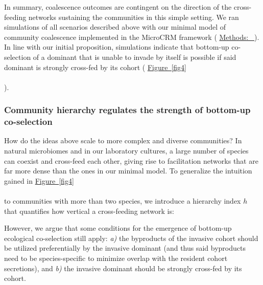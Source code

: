\documentclass[a4paper,10pt]{article}
\newcommand{\figref}[2][]{%
  \hyperref[{#2}]{%
    Figure~\ref*{#2}%
    \ifx\\#1\\%
    \else
      #1%
    \fi
  }%
}
\newcommand{\methodsref}[1]{%
  \hyperref[{methods:#1}]{%
   Methods:~\nameref*{methods:#1}%
  }%
}
\begin{document}
In summary, coalescence outcomes are contingent on the direction of the
cross-feeding networks sustaining the communities in this simple setting.
We ran simulations of all scenarios described above with our minimal model of community coalescence
implemented in the MicroCRM framework
(\methodsref{sim-min}).
In line with our initial proposition, simulations indicate that
bottom-up co-selection of a dominant that is unable to invade by itself
is possible if said dominant is strongly cross-fed by its cohort
(\figref{fig4}).

\subsubsection*{Community hierarchy regulates the strength of bottom-up co-selection}

How do the ideas above scale to more complex and diverse communities?
In natural microbiomes and in our laboratory cultures,
a large number of species can coexist and cross-feed each other,
giving rise to facilitation networks that are far more dense
than the ones in our minimal model.
To generalize the intuition gained in \figref{fig4} to communities with more than two species,
we introduce a hierarchy index $h$ that quantifies how vertical a cross-feeding network is:

\iffalse
However, we argue that some conditions
for the emergence of bottom-up ecological co-selection still apply:
\textit{a)} the byproducts of the invasive cohort should be utilized preferentially
by the invasive dominant (and thus said byproducts need to be species-specific
to minimize overlap with the resident cohort secretions),
and \textit{b)} the invasive dominant should be strongly cross-fed by its cohort.
\end{document}
